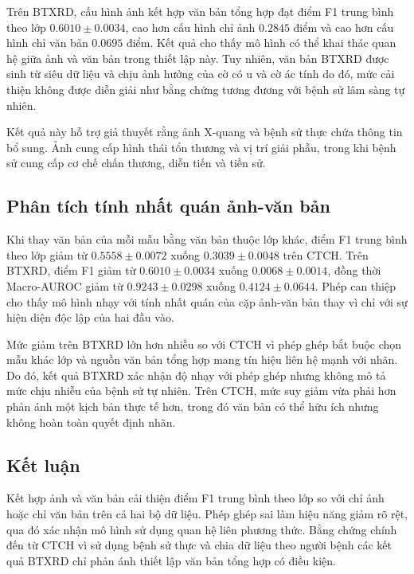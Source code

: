 Trên BTXRD, cấu hình ảnh kết hợp văn bản tổng hợp đạt điểm F1 trung bình theo lớp $0{.}6010\pm0{.}0034$, cao hơn cấu hình chỉ ảnh $0{.}2845$ điểm và cao hơn cấu hình chỉ văn bản $0{.}0695$ điểm. Kết quả cho thấy mô hình có thể khai thác quan hệ giữa ảnh và văn bản trong thiết lập này. Tuy nhiên, văn bản BTXRD được sinh từ siêu dữ liệu và chịu ảnh hưởng của cờ có u và cờ ác tính do đó, mức cải thiện không được diễn giải như bằng chứng tương đương với bệnh sử lâm sàng tự nhiên.

Kết quả này hỗ trợ giả thuyết rằng ảnh X-quang và bệnh sử thực chứa thông tin bổ sung. Ảnh cung cấp hình thái tổn thương và vị trí giải phẫu, trong khi bệnh sử cung cấp cơ chế chấn thương, diễn tiến và tiền sử.



\subsection{Phân tích tính nhất quán ảnh-văn bản}
Khi thay văn bản của mỗi mẫu bằng văn bản thuộc lớp khác, điểm F1 trung bình theo lớp giảm từ $0{.}5558\pm0{.}0072$ xuống $0{.}3039\pm0{.}0048$ trên CTCH. Trên BTXRD, điểm F1 giảm từ $0{.}6010\pm0{.}0034$ xuống $0{.}0068\pm0{.}0014$, đồng thời Macro-AUROC giảm từ $0{.}9243\pm0{.}0298$ xuống $0{.}4124\pm0{.}0644$. Phép can thiệp cho thấy mô hình nhạy với tính nhất quán của cặp ảnh-văn bản thay vì chỉ với sự hiện diện độc lập của hai đầu vào.

Mức giảm trên BTXRD lớn hơn nhiều so với CTCH vì phép ghép bắt buộc chọn mẫu khác lớp và nguồn văn bản tổng hợp mang tín hiệu liên hệ mạnh với nhãn. Do đó, kết quả BTXRD xác nhận độ nhạy với phép ghép nhưng không mô tả mức chịu nhiễu của bệnh sử tự nhiên. Trên CTCH, mức suy giảm vừa phải hơn phản ánh một kịch bản thực tế hơn, trong đó văn bản có thể hữu ích nhưng không hoàn toàn quyết định nhãn.

\subsection{Kết luận}

Kết hợp ảnh và văn bản cải thiện điểm F1 trung bình theo lớp so với chỉ ảnh hoặc chỉ văn bản trên cả hai bộ dữ liệu. Phép ghép sai làm hiệu năng giảm rõ rệt, qua đó xác nhận mô hình sử dụng quan hệ liên phương thức. Bằng chứng chính đến từ CTCH vì sử dụng bệnh sử thực và chia dữ liệu theo người bệnh các kết quả BTXRD chỉ phản ánh thiết lập văn bản tổng hợp có điều kiện.

